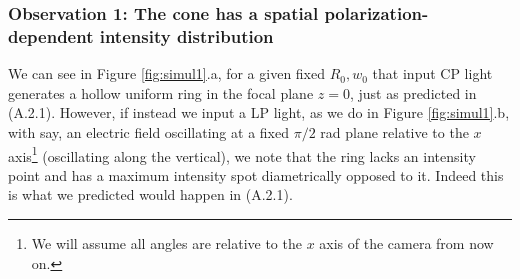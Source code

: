 \documentclass[11pt, a4paper, twoside]{article} %
\begin{document}
\subsubsection*{Observation 1: The cone has a spatial polarization-dependent intensity distribution}
We can see in Figure \ref{fig:simul1}.a, for a given fixed $R_0,w_0$ that input CP light generates a hollow uniform ring in the focal plane $z=0$, just as predicted in (A.2.1). However, if instead we input a LP light, as we do in Figure \ref{fig:simul1}.b, with say, an electric field oscillating at a fixed $\pi/2$ rad plane relative to the $x$ axis\footnote{We will assume all angles are relative to the $x$ axis of the camera from now on.} (oscillating along the vertical), we note that the ring lacks an intensity point and has a maximum intensity spot diametrically opposed to it. Indeed this is what we predicted would happen in (A.2.1). 
\end{document}
